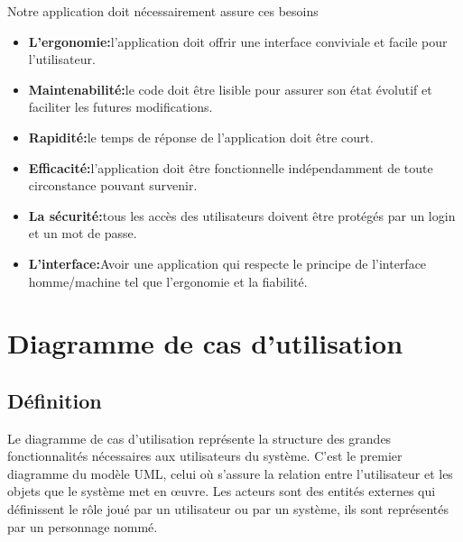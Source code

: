 \documentclass[edit,12pt,a4paper,ChapStyle,oneside,doubleinterligne]{report}
\begin{document}
Notre application doit nécessairement assure ces besoins
\begin{itemize}
    \item \textbf{L’ergonomie:}l’application doit offrir une interface conviviale et facile pour l’utilisateur.
    \item \textbf{Maintenabilité:}le code doit être lisible pour assurer son état évolutif et faciliter les futures modifications.
    \item \textbf{Rapidité:}le temps de réponse de l’application doit être court.
    \item \textbf{Efficacité:}l’application doit être fonctionnelle indépendamment de toute circonstance pouvant survenir.
    \item \textbf{La sécurité:}tous les accès des utilisateurs doivent être protégés par un login et un mot de passe.
    \item \textbf{L’interface:}Avoir une application qui respecte le principe de \newline l'interface homme/machine tel que l'ergonomie et la fiabilité.
\end{itemize}
\section{Diagramme de cas d'utilisation}
\subsection{Définition}
Le diagramme de cas d’utilisation représente la structure des grandes fonctionnalités
nécessaires aux utilisateurs du système. C’est le premier diagramme du modèle UML,
celui où s’assure la relation entre l’utilisateur et les objets que le système met en œuvre.
Les acteurs sont des entités externes qui définissent le rôle joué par un utilisateur ou par
un système, ils sont représentés par un personnage nommé. \cite{usecas}
\end{document}
